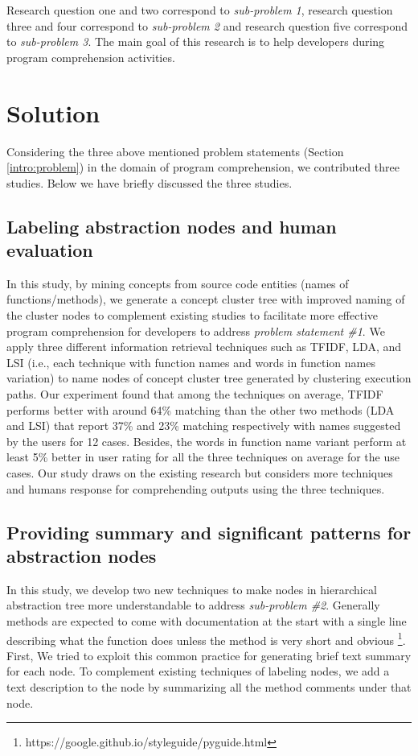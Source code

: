 Research question one and two correspond to \emph{sub-problem 1}, research question three and four correspond to \emph{sub-problem 2} and research question five correspond to \emph{sub-problem 3}. The main goal of this research is to help developers during program comprehension activities. 



\section{Solution}
\label{intro:solution}
Considering the three above mentioned problem statements (Section \ref{intro:problem}) in the domain of program comprehension, we contributed three studies. Below we have briefly discussed the three studies.  

\subsection{Labeling abstraction nodes and human evaluation}

In this study, by mining concepts from source code entities (names of functions/methods), we generate a concept cluster tree
with improved naming of the cluster nodes to complement existing studies to facilitate more effective program comprehension for
developers to address \emph{problem statement \#1}. We apply three different information retrieval techniques such as TFIDF, LDA, and LSI (i.e., each technique with function
names and words in function names variation) to name nodes of concept cluster tree generated by clustering execution paths. Our experiment found that among the techniques on average, TFIDF performs better with around 64\% matching than the other
two methods (LDA and LSI) that report 37\% and 23\% matching respectively with names suggested by the users for 12 cases. Besides,
the words in function name variant perform at least 5\% better in user rating for all the three techniques on average for the use cases.
Our study draws on the existing research but considers more techniques and humans response for comprehending outputs using the three
techniques.

\subsection{Providing summary and significant patterns for abstraction nodes}

In this study, we develop two new techniques to make nodes in hierarchical abstraction tree more understandable to address \emph{sub-problem \#2}. Generally methods are expected to come with documentation at the start with a single line describing what the function does unless the method is very short and obvious \footnote{https://google.github.io/styleguide/pyguide.html}. First, We tried to exploit this common practice for generating brief text summary for each node. 
To complement existing techniques of labeling nodes, we add a text description to the node by summarizing all the method comments under that node. 

